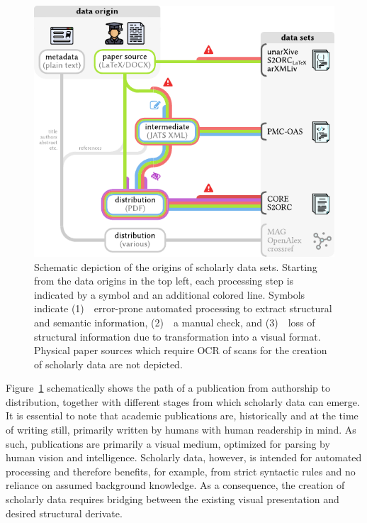 \begin{figure}[bt]
  \centering
  \includegraphics[width=\linewidth]{figures/foundations/scholarly_data_lifecycle_ystretch}
  \caption[Schematic depiction of the origins of scholarly data sets]{Schematic depiction of the origins of scholarly data sets. Starting from the data origins in the top left, each processing step is indicated by a symbol and an additional colored line. Symbols indicate (1)~{\color{warningsign-red}\faWarning}~error-prone automated processing to extract structural and semantic information, (2)~{\color{manualcheck-blue}\faPencilSquareO}~a manual check, and (3)~{\color{visualformat-purple}\faLowVision}~loss of structural information due to transformation into a visual format. Physical paper sources which require OCR of scans for the creation of scholarly data are not depicted.}
  \label{fig:foundations-datalifecycle}
\end{figure}

Figure~\ref{fig:foundations-datalifecycle} schematically shows the path of a publication from authorship to distribution, together with different stages from which scholarly data can emerge. It is essential to note that academic publications are, historically and at the time of writing still, primarily written by humans with human readership in mind. As such, publications are primarily a visual medium, optimized for parsing by human vision and intelligence. Scholarly data, however, is intended for automated processing and therefore benefits, for example, from strict syntactic rules and no reliance on assumed background knowledge. As a consequence, the creation of scholarly data requires bridging between the existing visual presentation and desired structural derivate.

